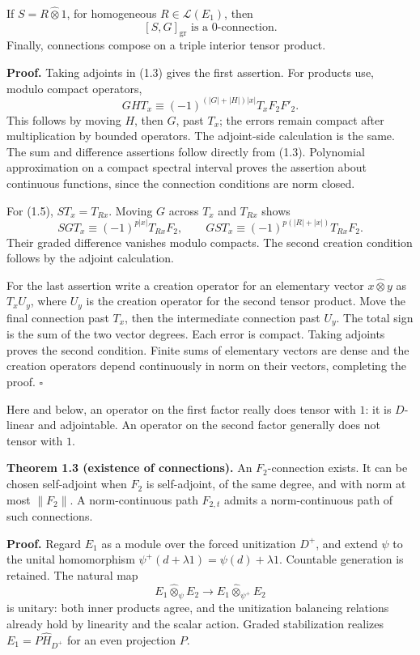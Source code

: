 \documentclass[
  11pt,
]{article}
\begin{document}
If \(S=R\widehat\otimes1\), for homogeneous \(R\in\mathcal L(E_1)\),
then \[
[S,G]_{\mathrm{gr}}\text{ is a }0\text{-connection}.
\tag{1.5}
\] Finally, connections compose on a triple interior tensor product.

\textbf{Proof.} Taking adjoints in (1.3) gives the first assertion. For
products use, modulo compact operators, \[
GH T_x
\equiv(-1)^{(|G|+|H|)|x|}T_xF_2F'_2.
\] This follows by moving \(H\), then \(G\), past \(T_x\); the errors
remain compact after multiplication by bounded operators. The
adjoint-side calculation is the same. The sum and difference assertions
follow directly from (1.3). Polynomial approximation on a compact
spectral interval proves the assertion about continuous functions, since
the connection conditions are norm closed.

For (1.5), \(ST_x=T_{Rx}\). Moving \(G\) across \(T_x\) and \(T_{Rx}\)
shows \[
SGT_x\equiv(-1)^{p|x|}T_{Rx}F_2,\qquad
GST_x\equiv(-1)^{p(|R|+|x|)}T_{Rx}F_2.
\] Their graded difference vanishes modulo compacts. The second creation
condition follows by the adjoint calculation.

For the last assertion write a creation operator for an elementary
vector \(x\widehat\otimes y\) as \(T_xU_y\), where \(U_y\) is the
creation operator for the second tensor product. Move the final
connection past \(T_x\), then the intermediate connection past \(U_y\).
The total sign is the sum of the two vector degrees. Each error is
compact. Taking adjoints proves the second condition. Finite sums of
elementary vectors are dense and the creation operators depend
continuously in norm on their vectors, completing the proof. \(\square\)

Here and below, an operator on the first factor really does tensor with
\(1\): it is \(D\)-linear and adjointable. An operator on the second
factor generally does not tensor with \(1\).

\textbf{Theorem 1.3 (existence of connections).} An \(F_2\)-connection
exists. It can be chosen self-adjoint when \(F_2\) is self-adjoint, of
the same degree, and with norm at most \(\|F_2\|\). A norm-continuous
path \(F_{2,t}\) admits a norm-continuous path of such connections.

\textbf{Proof.} Regard \(E_1\) as a module over the forced unitization
\(D^+\), and extend \(\psi\) to the unital homomorphism
\(\psi^+(d+\lambda1)=\psi(d)+\lambda1\). Countable generation is
retained. The natural map \[
E_1\widehat\otimes_\psi E_2
\longrightarrow E_1\widehat\otimes_{\psi^+}E_2
\] is unitary: both inner products agree, and the unitization balancing
relations already hold by linearity and the scalar action. Graded
stabilization realizes \(E_1=P\widehat H_{D^+}\) for an even projection
\(P\).
\end{document}
